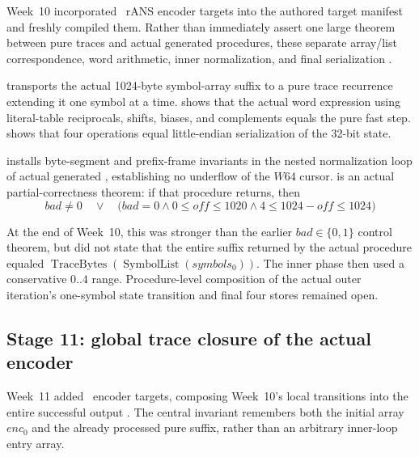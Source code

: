 Week~10 incorporated \WeekTenTargetCount\ rANS encoder targets into the authored
target manifest and freshly compiled them. Rather than immediately assert one
large theorem between pure traces and actual generated procedures, these
separate array/list correspondence, word arithmetic, inner normalization,
and final serialization \cite{week10-report,rans-encoder-invariant}.

\begin{verified}
 transports the actual 1024-byte
symbol-array suffix to a pure trace recurrence extending it one symbol at a
time.  shows that the actual
word expression using literal-table reciprocals, shifts, biases, and complements
equals the pure fast step.
 shows that four
 operations equal little-endian serialization of the 32-bit state.
\end{verified}

\begin{verified}
 installs byte-segment and
prefix-frame invariants in the nested normalization loop of actual generated
, establishing no underflow of the \(W64\) cursor.
 is an actual
partial-correctness theorem: if that procedure returns, then
\[
  bad\ne0\quad\lor\quad
  \bigl(bad=0\land 0\le off\le1020\land
        4\le1024-off\le1024\bigr)
\]
\end{verified}

At the end of Week~10, this was stronger than the earlier
\(bad\in\{0,1\}\) control theorem, but did not state that the entire suffix
returned by the actual procedure equaled
\(
\operatorname{TraceBytes}
  (\operatorname{SymbolList}(symbols_0))
\).
The inner phase then used a conservative \(0..4\) range.
Procedure-level composition of the actual outer iteration's one-symbol state
transition and final four stores remained open.

\subsection{Stage 11: global trace closure of the actual encoder}

Week~11 added \WeekElevenTargetCount\ encoder targets, composing Week~10's
local transitions into the entire successful output
\cite{week11-report,rans-encoder-invariant}.
The central invariant remembers both the initial array \(enc_0\) and the
already processed pure suffix, rather than an arbitrary inner-loop entry array.

